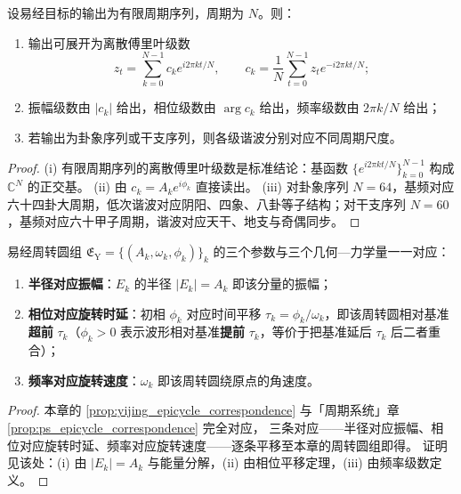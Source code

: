 \begin{theorem}[由易经数据构建周期级数]\label{thm:yijing_series_reconstruction}
设易经目标的输出为有限周期序列，周期为 $N$。则：
\begin{enumerate}[label=(\roman*)]
    \item 输出可展开为离散傅里叶级数
    \[
    z_t=\sum_{k=0}^{N-1}c_k e^{i2\pi kt/N},\qquad
    c_k=\frac1N\sum_{t=0}^{N-1}z_t e^{-i2\pi kt/N};
    \]
    \item 振幅级数由 $|c_k|$ 给出，相位级数由 $\arg c_k$ 给出，频率级数由 $2\pi k/N$ 给出；
    \item 若输出为卦象序列或干支序列，则各级谐波分别对应不同周期尺度。
\end{enumerate}
\end{theorem}

\begin{proof}
(i) 有限周期序列的离散傅里叶级数是标准结论：基函数 $\{e^{i2\pi kt/N}\}_{k=0}^{N-1}$ 构成 $\mathbb C^N$ 的正交基。
(ii) 由 $c_k=A_k e^{i\phi_k}$ 直接读出。
(iii) 对卦象序列 $N=64$，基频对应六十四卦大周期，低次谐波对应阴阳、四象、八卦等子结构；对干支序列 $N=60$，基频对应六十甲子周期，谐波对应天干、地支与奇偶同步。
\end{proof}

\begin{proposition}\label{prop:yijing_epicycle_correspondence}
易经周转圆组 $\mathfrak E_{\mathrm{Y}}=\{(A_k,\omega_k,\phi_k)\}_{k}$ 的三个参数与三个几何—力学量一一对应：
\begin{enumerate}[label=(\roman*)]
    \item \textbf{半径对应振幅}：$E_k$ 的半径 $|E_k|=A_k$ 即该分量的振幅；
    \item \textbf{相位对应旋转时延}：初相 $\phi_k$ 对应时间平移 $\tau_k=\phi_k/\omega_k$，即该周转圆相对基准\textbf{超前} $\tau_k$（$\phi_k>0$ 表示波形相对基准\textbf{提前} $\tau_k$，等价于把基准延后 $\tau_k$ 后二者重合）；
    \item \textbf{频率对应旋转速度}：$\omega_k$ 即该周转圆绕原点的角速度。
\end{enumerate}
\end{proposition}

\begin{proof}
本章的 \cref{prop:yijing_epicycle_correspondence} 与「周期系统」章 \cref{prop:ps_epicycle_correspondence} 完全对应，
三条对应——半径对应振幅、相位对应旋转时延、频率对应旋转速度——逐条平移至本章的周转圆组即得。
证明见该处：(i) 由 $|E_k|=A_k$ 与能量分解，(ii) 由相位平移定理，(iii) 由频率级数定义。
\end{proof}

